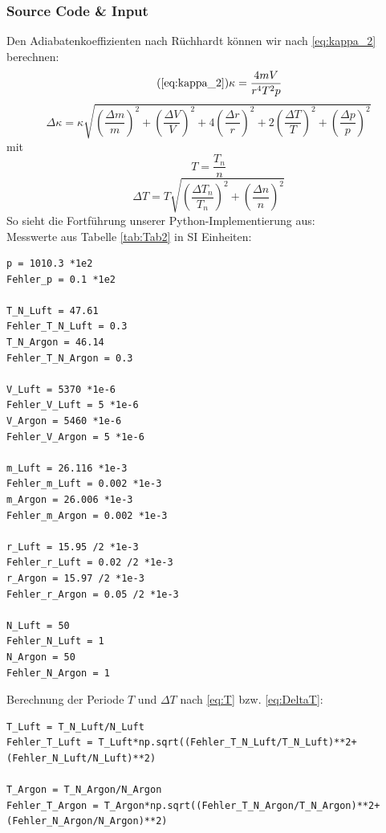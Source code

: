 \documentclass[a4paper,10pt]{article}
\begin{document}
\subsubsection{Source Code \& Input}
Den Adiabatenkoeffizienten nach Rüchhardt können wir nach \eqref{eq:kappa_2} berechnen:
\begin{equation} \tag{\ref{eq:kappa_2}}
\kappa = \frac{4 m V}{r^4 T^2 p} 
\end{equation}
\begin{equation} \label{eq:Deltakappa_2}
\Delta \kappa = \kappa \sqrt{{\left(\frac{ \Delta  m}{m}\right)^2}+{\left(\frac{ \Delta V}{V}\right)^2}+4{\left(\frac{ \Delta r}{r}\right)^2}+2{\left(\frac{ \Delta T}{T}\right)^2}+{\left(\frac{ \Delta p}{p}\right)^2}}
\end{equation}
mit
\begin{equation} \label{eq:T}
T = \frac{T_n}{n} 
\end{equation}
\begin{equation} \label{eq:DeltaT}
\Delta T = T\sqrt{{\left(\frac{\Delta T_n}{T_n}\right)}^2 +{\left(\frac{\Delta n}{n}\right)}^2 }
\end{equation}
So sieht die Fortführung unserer Python-Implementierung aus:\\

Messwerte aus Tabelle \ref{tab:Tab2} in SI Einheiten:
\begin{lstlisting}
p = 1010.3 *1e2
Fehler_p = 0.1 *1e2

T_N_Luft = 47.61
Fehler_T_N_Luft = 0.3
T_N_Argon = 46.14
Fehler_T_N_Argon = 0.3

V_Luft = 5370 *1e-6
Fehler_V_Luft = 5 *1e-6
V_Argon = 5460 *1e-6
Fehler_V_Argon = 5 *1e-6

m_Luft = 26.116 *1e-3 
Fehler_m_Luft = 0.002 *1e-3
m_Argon = 26.006 *1e-3
Fehler_m_Argon = 0.002 *1e-3

r_Luft = 15.95 /2 *1e-3 
Fehler_r_Luft = 0.02 /2 *1e-3
r_Argon = 15.97 /2 *1e-3
Fehler_r_Argon = 0.05 /2 *1e-3

N_Luft = 50
Fehler_N_Luft = 1
N_Argon = 50
Fehler_N_Argon = 1

\end{lstlisting}

Berechnung der Periode \(T\) und \(\Delta T\) nach \eqref{eq:T} bzw. \eqref{eq:DeltaT}:\begin{lstlisting}
T_Luft = T_N_Luft/N_Luft
Fehler_T_Luft = T_Luft*np.sqrt((Fehler_T_N_Luft/T_N_Luft)**2+(Fehler_N_Luft/N_Luft)**2)

T_Argon = T_N_Argon/N_Argon
Fehler_T_Argon = T_Argon*np.sqrt((Fehler_T_N_Argon/T_N_Argon)**2+(Fehler_N_Argon/N_Argon)**2)

\end{lstlisting}
\end{document}

